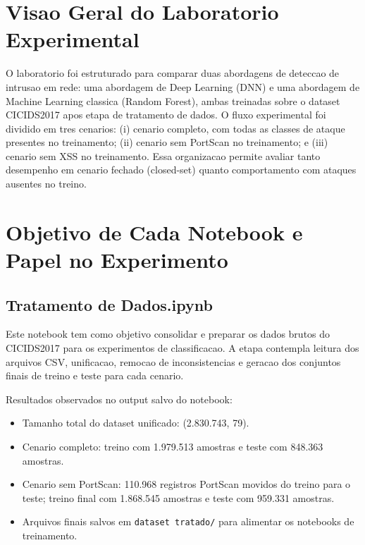 
\section{Visao Geral do Laboratorio Experimental}

O laboratorio foi estruturado para comparar duas abordagens de deteccao de intrusao em rede: uma abordagem de Deep Learning (DNN) e uma abordagem de Machine Learning classica (Random Forest), ambas treinadas sobre o dataset CICIDS2017 apos etapa de tratamento de dados. O fluxo experimental foi dividido em tres cenarios: (i) cenario completo, com todas as classes de ataque presentes no treinamento; (ii) cenario sem PortScan no treinamento; e (iii) cenario sem XSS no treinamento. Essa organizacao permite avaliar tanto desempenho em cenario fechado (closed-set) quanto comportamento com ataques ausentes no treino.


\section{Objetivo de Cada Notebook e Papel no Experimento}

\subsection{Tratamento de Dados.ipynb}

Este notebook tem como objetivo consolidar e preparar os dados brutos do CICIDS2017 para os experimentos de classificacao. A etapa contempla leitura dos arquivos CSV, unificacao, remocao de inconsistencias e geracao dos conjuntos finais de treino e teste para cada cenario.

Resultados observados no output salvo do notebook:
\begin{itemize}
\item Tamanho total do dataset unificado: (2.830.743, 79).
\item Cenario completo: treino com 1.979.513 amostras e teste com 848.363 amostras.
\item Cenario sem PortScan: 110.968 registros PortScan movidos do treino para o teste; treino final com 1.868.545 amostras e teste com 959.331 amostras.
\item Arquivos finais salvos em \texttt{dataset tratado/} para alimentar os notebooks de treinamento.
\end{itemize}

